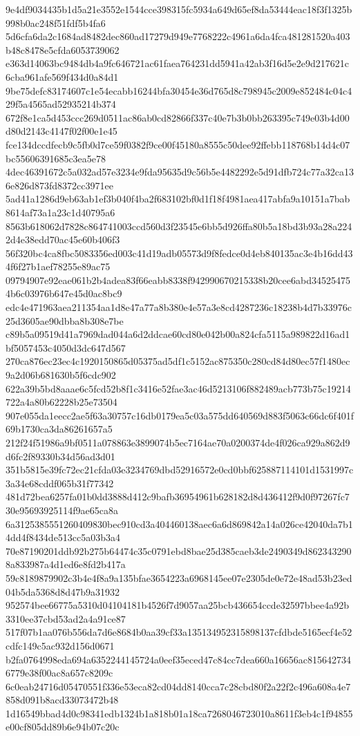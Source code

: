 {9e4df9034435b1d5a21e3552e1544cce398315fc5934a649d65ef8da53444eac18f3f1325b998b0ac248f51fdf5b4fa6
5d6cfa6da2c1684ad8482dec860ad17279d949e7768222c4961a6da4fca481281520a403b48c8478e5cfda6053739062
e363d14063bc9484db4a9fc646721ac61faea764231dd5941a42ab3f16d5e2e9d217621c6cba961afe569f434d0a84d1
9be75defc83174607c1e54ecabb16244bfa30454e36d765d8c798945c2009e852484c04c429f5a4565ad52935214b374
672f8e1ca5d453ccc269d0511ac86ab0cd82866f337c40e7b3b0bb263395c749e03b4d00d80d2143c4147f02f00e1e45
fce134dccdfecb9c5fb0d7ce59f0382f9ce00f45180a8555c50dee92ffebb118768b14d4c07bc55606391685c3ea5e78
4dec46391672c5a032ad57e3234e9fda95635d9c56b5e4482292e5d91dfb724c77a32ca136e826d873fd8372cc3971ee
5ad41a1286d9eb63ab1ef3b040f4ba2f683102bf0d1f18f4981aea417abfa9a10151a7bab8614af73a1a23c1d40795a6
8563b618062d7828c864741003ccd560d3f23545e6bb5d926ffa80b5a18bd3b93a28a2242d4e38edd70ac45e60b406f3
56f320bc4ca8fbc5083356ed003c41d19adb05573d9f8fedce0d4eb840135ac3e4b16dd434f6f27b1aef78255e89ac75
09794907e92eae061b2b4adea83f66eabb8338f942990670215338b20cee6abd345254754b6c03976b647e45d0ac8bc9
edc4e471963aea211354aa1d8e47a77a8b380e4e57a3e8cd4287236c18238b4d7b33976c25d3605ae90dbba8b308e7be
c89b5a09519d41a7969dad044a6d2ddcae60cd80e042b00a824cfa5115a989822d16ad1bf5057453c4050d3dc647d567
270ca876ec23ec4c1920150865d05375ad5df1c5152ac875350c280cd84d80ec57f1480ec9a2d06b681630b5f6cdc902
622a39b5bd8aaae6c5fcd52b8f1c3416e52fae3ac46d5213106f882489acb773b75c19214722a4a80b62228b25e73504
907e055da1eecc2ae5f63a30757c16db0179ea5c03a575dd640569d883f5063c66dc6f401f69b1730ca3da86261657a5
212f24f51986a9bf0511a078863e3899074b5ec7164ae70a0200374de4f026ca929a862d9d6fc2f89330b34d56ad3d01
351b5815e39fc72ec21cfda03e3234769dbd52916572e0cd0bbf625887114101d1531997c3a34e68cddf065b31f77342
481d72bea6257fa01b0dd3888d412c9bafb36954961b628182d8d436412f9d0f97267fc730e95693925114f9ae65ca8a
6a3125385551260409830bec910cd3a404460138aec6a6d869842a14a026ce42040da7b14dd4f8434de513cc5a03b3a4
70e87190201ddb92b275b64474c35c0791ebd8bae25d385caeb3de2490349d8623432908a833987a4d1ed6e8fd2b417a
59c8189879902c3b4e4f8a9a135bfae3654223a6968145ee07e2305de0e72e48ad53b23ed04b5da5368d8d47b9a31932
952574bee66775a5310d04104181b4526f7d9057aa25bcb436654ccde32597bbee4a92b3310ee37cbd53ad2a4a91ce87
517f07b1aa076b556da7d6e8684b0aa39cf33a135134952315898137cfdbde5165ecf4e52cdfc149c5ac932d156d0671
b2fa0764998eda694a6352244145724a0eef35eced47c84cc7dea660a16656ac8156427346779e38f00ac8a657c8209c
6c0eab24716d05470551f336e53eca82cd04dd8140cca7c28cbd80f2a22f2c496a608a4e7858d091b8acd33073472b48
1d16549bbad4d0c98341edb1324b1a818b01a18ca7268046723010a8611f3eb4c1f94855e00cf805dd89b6e94b07c20c
}
